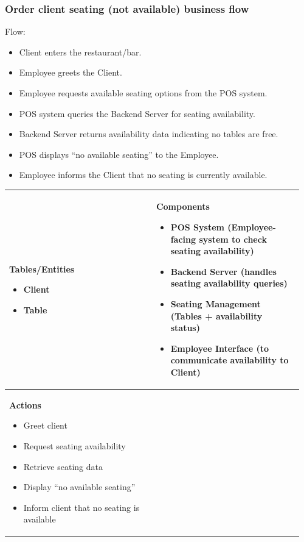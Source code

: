 \documentclass[]{VUMIFTemplateClass}
\newenvironment{mpitemlist}[1][\linewidth]{%
    \begin{minipage}[t]{#1}%
        \setlength{\leftmargini}{12pt}%
        \begin{itemize}%
            \setlength{\itemsep}{1pt}%
            \setlength{\parskip}{0pt}%
            \setlength{\parsep}{0pt}%
}{%
        \end{itemize}%
    \end{minipage}\newline
}
\begin{document}
\subsubsection{Order client seating (not available) business flow}

Flow:
\begin{itemize}
\setlength{\itemsep}{2pt}
\setlength{\parskip}{0pt}
\setlength{\parsep}{0pt}
\item Client enters the restaurant/bar.
\item Employee greets the Client.
\item Employee requests available seating options from the POS system.
\item POS system queries the Backend Server for seating availability.
\item Backend Server returns availability data indicating no tables are free.
\item POS displays “no available seating” to the Employee.
\item Employee informs the Client that no seating is currently available.
\end{itemize}

\begin{center}
\setlength{\tabcolsep}{8pt}
\begin{tabular}{|p{0.48\linewidth}|p{0.48\linewidth}|}
\hline
\textbf{Tables/Entities} \newline
\begin{mpitemlist}
    \item Client
    \item Table
\end{mpitemlist}
&
\textbf{Components} \newline
\begin{mpitemlist}
    \item POS System (Employee-facing system to check seating availability)
    \item Backend Server (handles seating availability queries)
    \item Seating Management (Tables + availability status)
    \item Employee Interface (to communicate availability to Client)
\end{mpitemlist}
\\ \hline
\textbf{Actions} \newline
\begin{mpitemlist}
    \item Greet client
    \item Request seating availability
    \item Retrieve seating data
    \item Display “no available seating”
    \item Inform client that no seating is available
\end{mpitemlist}
&

\\ \hline
\end{tabular}
\end{center}
\end{document}
